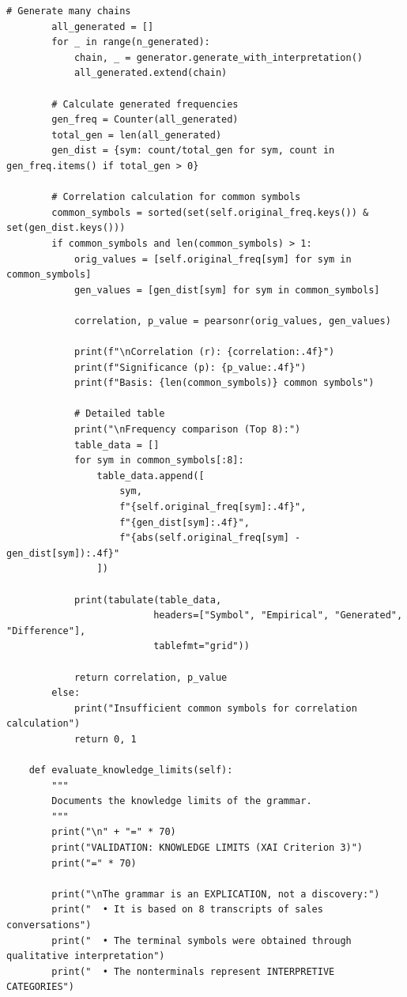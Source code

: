 \documentclass[
  12pt,
  a4paper,
  oneside,
  titlepage
]{article}
\begin{document}
\begin{lstlisting}[caption=Algorithmic Recursive Sequence Analysis 3.0 - Hierarchical Grammar Induction]
        # Generate many chains
        all_generated = []
        for _ in range(n_generated):
            chain, _ = generator.generate_with_interpretation()
            all_generated.extend(chain)
        
        # Calculate generated frequencies
        gen_freq = Counter(all_generated)
        total_gen = len(all_generated)
        gen_dist = {sym: count/total_gen for sym, count in gen_freq.items() if total_gen > 0}
        
        # Correlation calculation for common symbols
        common_symbols = sorted(set(self.original_freq.keys()) & set(gen_dist.keys()))
        if common_symbols and len(common_symbols) > 1:
            orig_values = [self.original_freq[sym] for sym in common_symbols]
            gen_values = [gen_dist[sym] for sym in common_symbols]
            
            correlation, p_value = pearsonr(orig_values, gen_values)
            
            print(f"\nCorrelation (r): {correlation:.4f}")
            print(f"Significance (p): {p_value:.4f}")
            print(f"Basis: {len(common_symbols)} common symbols")
            
            # Detailed table
            print("\nFrequency comparison (Top 8):")
            table_data = []
            for sym in common_symbols[:8]:
                table_data.append([
                    sym,
                    f"{self.original_freq[sym]:.4f}",
                    f"{gen_dist[sym]:.4f}",
                    f"{abs(self.original_freq[sym] - gen_dist[sym]):.4f}"
                ])
            
            print(tabulate(table_data, 
                          headers=["Symbol", "Empirical", "Generated", "Difference"],
                          tablefmt="grid"))
            
            return correlation, p_value
        else:
            print("Insufficient common symbols for correlation calculation")
            return 0, 1
    
    def evaluate_knowledge_limits(self):
        """
        Documents the knowledge limits of the grammar.
        """
        print("\n" + "=" * 70)
        print("VALIDATION: KNOWLEDGE LIMITS (XAI Criterion 3)")
        print("=" * 70)
        
        print("\nThe grammar is an EXPLICATION, not a discovery:")
        print("  • It is based on 8 transcripts of sales conversations")
        print("  • The terminal symbols were obtained through qualitative interpretation")
        print("  • The nonterminals represent INTERPRETIVE CATEGORIES")
        

\end{lstlisting}
\end{document}
